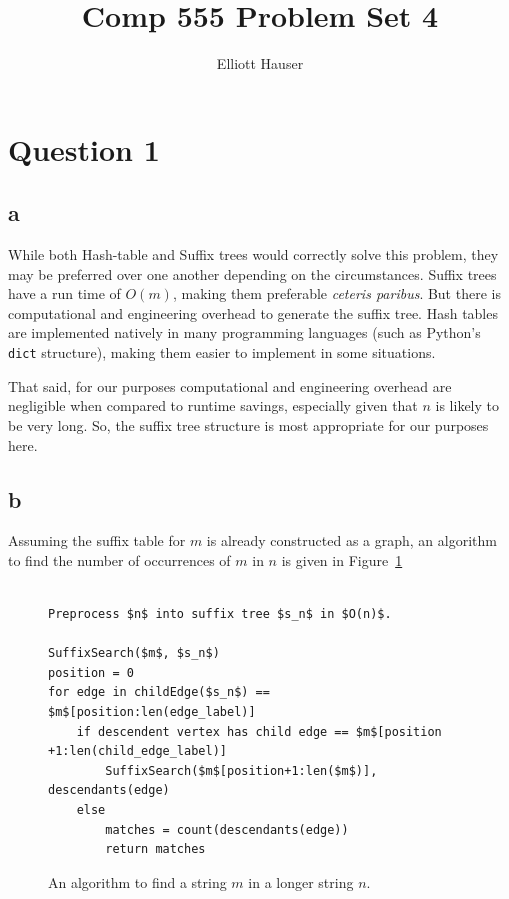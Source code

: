 \documentclass[12pt]{article}
\author{Elliott Hauser}
\title{Comp 555 Problem Set 4}
\begin{document}
\maketitle
\section*{Question 1}
\subsection*{a}  While both Hash-table and Suffix trees would correctly solve this problem, they may be preferred over one another depending on the circumstances.  Suffix trees have a run time of $O(m)$, making them preferable \textit{ceteris paribus}.  But there is computational and engineering overhead to generate the suffix tree. Hash tables are implemented natively in many programming languages (such as Python's \lstinline{dict} structure), making them easier to implement in some situations.

That said, for our purposes computational and engineering overhead are negligible when compared to runtime savings, especially given that $n$ is likely to be very long.  So, the suffix tree structure is most appropriate for our purposes here.

\subsection*{b} Assuming the suffix table for $m$ is already constructed as a graph, an algorithm to find the number of occurrences of $m$ in $n$ is given in Figure~\ref{suffsearch}
\begin{figure}[ht]
\begin{framed}
\begin{lstlisting}

Preprocess $n$ into suffix tree $s_n$ in $O(n)$.

SuffixSearch($m$, $s_n$)
position = 0
for edge in childEdge($s_n$) == $m$[position:len(edge_label)]
	if descendent vertex has child edge == $m$[position +1:len(child_edge_label)]
		SuffixSearch($m$[position+1:len($m$)], descendants(edge)
	else
		matches = count(descendants(edge))
		return matches

\end{lstlisting}
\end{framed}
\caption{An algorithm to find a string $m$ in a longer string $n$.}
\label{suffsearch}
\end{figure}
\end{document}
